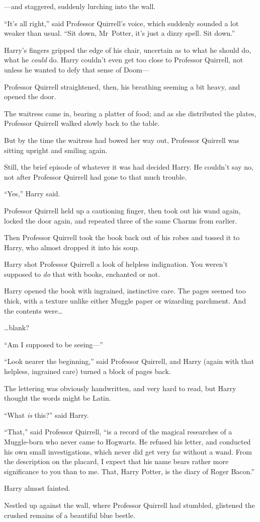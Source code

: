 —and staggered, suddenly lurching into the wall.

“It’s all right,” said Professor Quirrell’s voice, which suddenly sounded a lot weaker than usual. “Sit down, Mr~Potter, it’s just a dizzy spell. Sit down.”

Harry’s fingers gripped the edge of his chair, uncertain as to what he should do, what he \emph{could} do. Harry couldn’t even get too close to Professor Quirrell, not unless he wanted to defy that sense of Doom—

Professor Quirrell straightened, then, his breathing seeming a bit heavy, and opened the door.

The waitress came in, bearing a platter of food; and as she distributed the plates, Professor Quirrell walked slowly back to the table.

But by the time the waitress had bowed her way out, Professor Quirrell was sitting upright and smiling again.

Still, the brief episode of whatever it was had decided Harry. He couldn’t say no, not after Professor Quirrell had gone to that much trouble.

“Yes,” Harry said.

Professor Quirrell held up a cautioning finger, then took out his wand again, locked the door again, and repeated three of the same Charms from earlier.

Then Professor Quirrell took the book back out of his robes and tossed it to Harry, who almost dropped it into his soup.

Harry shot Professor Quirrell a look of helpless indignation. You weren’t supposed to \emph{do} that with books, enchanted or not.

Harry opened the book with ingrained, instinctive care. The pages seemed too thick, with a texture unlike either Muggle paper or wizarding parchment. And the contents were…

…blank?

“Am I supposed to be seeing—”

“Look nearer the beginning,” said Professor Quirrell, and Harry (again with that helpless, ingrained care) turned a block of pages back.

The lettering was obviously handwritten, and very hard to read, but Harry thought the words might be Latin.

“What \emph{is} this?” said Harry.

“That,” said Professor Quirrell, “is a record of the magical researches of a Muggle-born who never came to Hogwarts. He refused his letter, and conducted his own small investigations, which never did get very far without a wand. From the description on the placard, I expect that his name bears rather more significance to you than to me. That, Harry Potter, is the diary of Roger Bacon.”

Harry almost fainted.

Nestled up against the wall, where Professor Quirrell had stumbled, glistened the crushed remains of a beautiful blue beetle.

